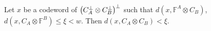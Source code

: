 %
%   
%
% 
 \begin{claim}  
   \label{claim:close}
   Let $x$ be a codeword of $\left( C_{A}^{\perp}\otimes C_{B}^{\perp} \right)^{\perp}$ such that $d(x, \mathbb{F}^{A} \otimes C_{B})$, $d(x, C_{A}\otimes\mathbb{F}^{B}) \le \xi < w$. Then $d(x, C_{A} \otimes C_{B}) < \xi $. 
 \end{claim} 
